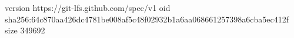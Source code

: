 version https://git-lfs.github.com/spec/v1
oid sha256:64c870aa426dc4781be008af5c48f02932b1a6aa068661257398a6cba5ec412f
size 349692
